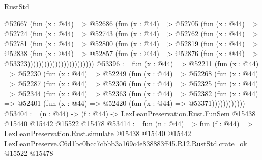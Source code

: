 \begin{lexlean}{RustStd}
\begin{coremodule}
                          @52667
                            (fun (x : @44) =>
                            @52686
                              (fun (x : @44) =>
                              @52705
                                (fun (x : @44) =>
                                @52724
                                  (fun (x : @44) =>
                                  @52743
                                    (fun (x : @44) =>
                                    @52762
                                      (fun (x : @44) =>
                                      @52781
                                        (fun (x : @44) =>
                                        @52800
                                          (fun (x : @44) =>
                                          @52819
                                            (fun (x : @44) =>
                                            @52838
                                              (fun (x : @44) =>
                                              @52857
                                                (fun (x : @44) =>
                                                @52876
                                                  (fun (x : @44) => @53323))))))))))))))))))))))))
@53396 := fun (x : @44) =>
  @52211
    (fun (x : @44) =>
    @52230
      (fun (x : @44) =>
      @52249
        (fun (x : @44) =>
        @52268
          (fun (x : @44) =>
          @52287
            (fun (x : @44) =>
            @52306
              (fun (x : @44) =>
              @52325
                (fun (x : @44) =>
                @52344
                  (fun (x : @44) =>
                  @52363
                    (fun (x : @44) =>
                    @52382
                      (fun (x : @44) =>
                      @52401 (fun (x : @44) => @52420 (fun (x : @44) => @53371))))))))))))
@53404 := (n : @44) ->
  (f : @44) -> LexLeanPreservation.Rust.FunSem @15438 @15440 @15442 @15522 @15478
@53414 := fun (n : @44) =>
  fun (f : @44) =>
  LexLeanPreservation.Rust.simulate
    @15438
    @15440
    @15442
    LexLeanPreserve.C6d1bc0bcc7cbbb3a169c4e838883ff45.R12.RustStd.crate_ok
    @15522
    @15478
\end{coremodule}
\end{lexlean}
